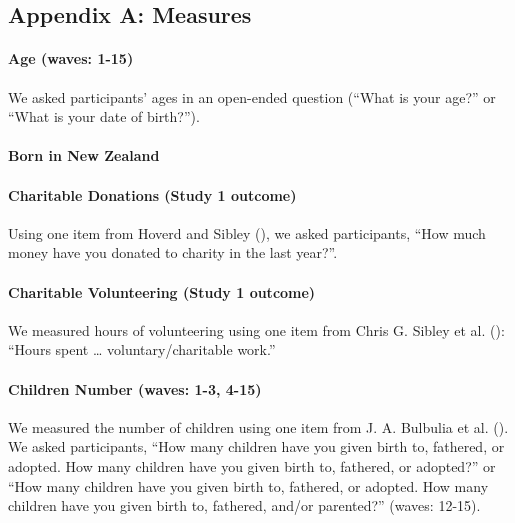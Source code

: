 \documentclass[
  single column]{article}
\let\oldparagraph\paragraph
\renewcommand{\paragraph}[1]{\oldparagraph{#1}\mbox{}}
\begin{document}
\newpage{}

\subsection{Appendix A: Measures}\label{appendix-measures}

\paragraph{Age (waves: 1-15)}\label{age-waves-1-15}

We asked participants' ages in an open-ended question (``What is your
age?'' or ``What is your date of birth?'').

\paragraph{Born in New Zealand}\label{born-in-new-zealand}

\paragraph{Charitable Donations (Study 1
outcome)}\label{charitable-donations-study-1-outcome}

Using one item from Hoverd and Sibley
(), we asked participants,
``How much money have you donated to charity in the last year?''.

\paragraph{Charitable Volunteering (Study 1
outcome)}\label{charitable-volunteering-study-1-outcome}

We measured hours of volunteering using one item from Chris G. Sibley et
al. (): ``Hours spent \ldots{}
voluntary/charitable work.''

\paragraph{Children Number (waves: 1-3,
4-15)}\label{children-number-waves-1-3-4-15}

We measured the number of children using one item from J. A. Bulbulia et
al. (). We asked participants, ``How
many children have you given birth to, fathered, or adopted. How many
children have you given birth to, fathered, or adopted?'' or ``How many
children have you given birth to, fathered, or adopted. How many
children have you given birth to, fathered, and/or parented?'' (waves:
12-15).
\end{document}
